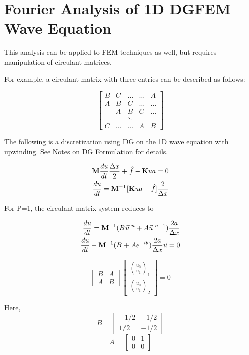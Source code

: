 \documentclass[10pt]{article}
\begin{document}
\section{Fourier Analysis of 1D DGFEM Wave Equation}

	This analysis can be applied to FEM techniques as well, but requires manipulation of circulant matrices. 
	
	For example, a circulant matrix with three entries can be described as follows:
	
	\[
	\begin{bmatrix}
		B & C & \hdots & \hdots & A\\
		A & B & C & \hdots& \hdots\\
		& A & B & C & \hdots\\
		& & \ddots\\
		C & \hdots & \hdots& A & B
	\end{bmatrix}
	\]
	
	The following is a discretization using DG on the 1D wave equation with upwinding. See Notes on DG Formulation for details.
	
	\begin{align}
		{\bf{M}} \frac{du}{dt} \frac{\Delta x}{2} + \hat{f} - {\bf{K}}ua = 0 \\
		\frac{du}{dt} = {\bf{M}}^{-1}[{\bf{K}}ua - \hat{f}]\frac{2}{\Delta x}
	\end{align}

	For P=1, the circulant matrix system reduces to 
	
	\begin{align}
		\frac{du}{dt} = {\bf{M}}^{-1} (B\vec{u}\;^n + A\vec{u}\;^{n-1}) \frac{2a}{\Delta x} \\
		\frac{du}{dt} - {\bf{M}}^{-1} (B + Ae^{-i\theta}) \frac{2a}{\Delta x}\vec{u} = 0
	\end{align}

	\[
	\begin{bmatrix}
		B & A\\
		A & B
	\end{bmatrix}
	\begin{bmatrix}
		\binom{u_0}{u_1}_1\\
		\binom{u_0}{u_1}_2
	\end{bmatrix}
	=0
	\]
	
	Here, 
	\[B = 
	\begin{bmatrix}
		-1/2 & -1/2\\
		1/2 & -1/2
	\end{bmatrix}\]
	\[A = 
	\begin{bmatrix}
		0 & 1\\
		0 & 0
	\end{bmatrix}\]
\end{document}
